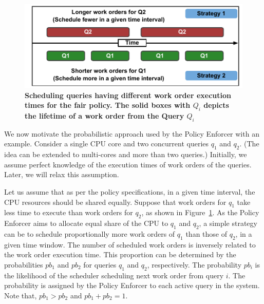 \begin{figure}[]
	\centering
	\includegraphics[width=\columnwidth]{policy/figures/Probability-explanation.pdf}
	\caption{\textbf{Scheduling queries having different work order execution times for the fair policy. The solid boxes with $Q_{i}$ depicts the lifetime of a work order from the Query $Q_{i}$}}
	\label{fig:probability-explanation}
\end{figure}

We now motivate the probabilistic approach used by the Policy Enforcer with an example.
Consider a single CPU core and two concurrent queries $q_{1}$ and $q_{2}$. 
(The idea can be extended to multi-cores and more than two queries.)
Initially, we assume perfect knowledge of the execution times of work orders of the queries. 
Later, we will relax this assumption. 

Let us assume that as per the policy specifications, in a given time interval, the CPU resources should be shared equally. 
Suppose that work orders for $q_{1}$ take less time to execute than work orders for 
$q_{2}$, as shown in Figure~\ref{fig:probability-explanation}.
As the Policy Enforcer aims to allocate equal share of the CPU to $q_1$ and $q_2$, a simple strategy can be to schedule proportionally more work orders of $q_{1}$  than those of $q_{2}$, in a given time window. 
The number of scheduled work orders is inversely related to the work order execution 
time. 
This proportion can be determined by the probabilities $pb_{1}$ and $pb_{2}$ for queries $q_1$ and $q_2$, respectively.
The probability $pb_i$ is the likelihood of the scheduler scheduling next work order from query $i$. 
The probability is assigned by the Policy Enforcer to each active query in the system.
Note that, $pb_{1} > pb_{2}$ and $pb_{1} + pb_{2} = 1$.


